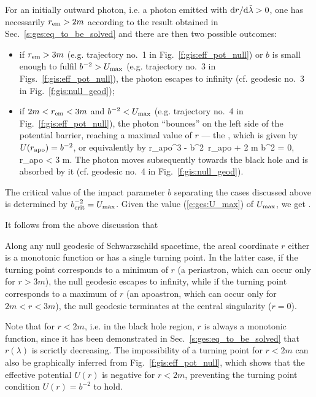 For an initially outward photon, i.e. a photon emitted with ${\mathrm{d} r}/{\mathrm{d}\tilde{\lambda}} > 0$,
one has necessarily $r_{\rm em}>2m$ according to the result obtained in Sec.~\ref{s:ges:eq_to_be_solved}
and there are then two possible outcomes:

\begin{itemize}
\item if $r_{\rm em} > 3 m$ (e.g. trajectory
no.~1 in Fig.~\ref{f:gis:eff_pot_null}) or
$b$ is small enough to fulfil $b^{-2} > U_{\rm max}$ (e.g. trajectory
no.~3 in Figs.~\ref{f:gis:eff_pot_null}), the photon escapes to infinity
(cf. geodesic no.~3 in Fig.~\ref{f:gis:null_geod});
\item if $2m < r_{\rm em} < 3 m$ and $b^{-2} < U_{\rm max}$ (e.g. trajectory
no.~4 in Fig.~\ref{f:gis:eff_pot_null}), the photon ``bounces'' on the left
side of the potential barrier, reaching a maximal value of $r$
--- the ,
which is given by  $U(r_{\rm apo}) = b^{-2}$, or equivalently by
\be \label{e:ges:r_apo_null}
   r_{\rm apo}^3 - b^2\, r_{\rm apo} + 2 m b^2 = 0, \quad r_{\rm apo} < 3 m.
\ee
The photon moves subsequently towards the black hole and
is absorbed by it (cf. geodesic no.~4 in Fig.~\ref{f:gis:null_geod}).
\end{itemize}

The critical value of the impact parameter $b$ separating the cases discussed
above is determined by $b_{\rm crit}^{-2} = U_{\rm max}$.
Given the value (\ref{e:ges:U_max}) of $U_{\rm max}$, we get
\be \label{e:ges:b_crit}
    .
\ee

It follows from the above discussion that
\begin{greybox}
Along any null geodesic of Schwarzschild spacetime, the areal coordinate $r$
either is a monotonic function or has a single turning point. In the latter case,
if the turning point corresponds to a minimum of $r$ (a periastron, which can occur
only for $r>3m$), the null geodesic escapes to infinity, while if the turning
point corresponds to a maximum of $r$ (an apoastron, which can occur only for $2m<r<3m$), the
null geodesic terminates at the central singularity ($r=0$).
\end{greybox}
Note that for $r<2m$, i.e. in the black hole region, $r$
is always a monotonic function, since it has been demonstrated in
Sec.~\ref{s:ges:eq_to_be_solved} that $r(\lambda)$ is scrictly
decreasing. The impossibility of a turning point for $r<2m$ can also be
graphically inferred from Fig.~\ref{f:gis:eff_pot_null}, which shows
that the effective potential $U(r)$ is negative for $r<2m$,
preventing the turning point condition $U(r) = b^{-2}$ to hold.

